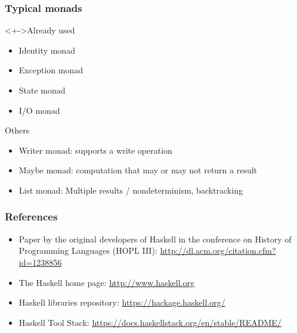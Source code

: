 \documentclass{beamer}
\begin{document}
\begin{frame}[fragile]
  \frametitle{Typical monads}
  \begin{block}<+->{Already used}
  \begin{itemize}       
  \item Identity monad
  \item Exception monad
  \item State monad
  \item I/O monad
  \end{itemize} 
\end{block}
\begin{block}{Others}
  \begin{itemize}
  \item Writer monad: supports a write operation
  \item Maybe monad: computation that may or may not return a result
  \item List monad: Multiple results / nondeterminism, backtracking
  \end{itemize}
\end{block}
\end{frame}

\begin{frame}
  \frametitle{References}
  \begin{itemize}
  \item Paper by the original developers of Haskell in the conference on History of
    Programming Languages (HOPL III): \href{A History
      of Haskell: Being Lazy with
      Class}{http://dl.acm.org/citation.cfm?id=1238856}
  \item The Haskell home page: \url{http://www.haskell.org}
  \item Haskell libraries repository:
    \url{https://hackage.haskell.org/}
  \item Haskell Tool Stack: \url{https://docs.haskellstack.org/en/stable/README/}
  \end{itemize}
\end{frame}


\begin{frame}
  \begin{center}
  \end{center}
\end{frame}
\end{document}
